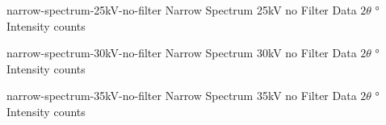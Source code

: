 \documentclass{WitsPhysicsReport}
\begin{document}
                                          {narrow-spectrum-25kV-no-filter} %
                                          {Narrow Spectrum 25kV no Filter} %
                                          {Data} %
                                          {$2 \theta$} %
                                          {\si{\degree}} %
                                          {Intensity} %
                                          {counts} %
                                          {%
                                          }


                                          {narrow-spectrum-30kV-no-filter} %
                                          {Narrow Spectrum 30kV no Filter} %
                                          {Data} %
                                          {$2 \theta$} %
                                          {\si{\degree}} %
                                          {Intensity} %
                                          {counts} %
                                          {%
                                          }

\lipsum[13]

                                          {narrow-spectrum-35kV-no-filter} %
                                          {Narrow Spectrum 35kV no Filter} %
                                          {Data} %
                                          {$2 \theta$} %
                                          {\si{\degree}} %
                                          {Intensity} %
                                          {counts} %
                                          {%
                                          }
\end{document}
